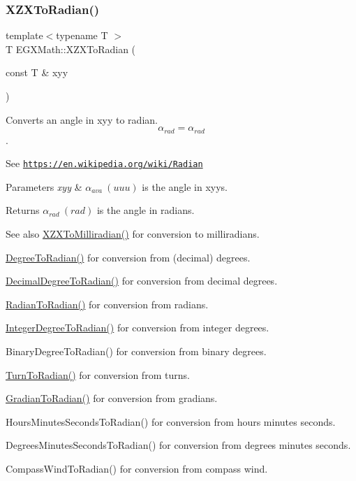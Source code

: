 \subsubsection{\texorpdfstring{X\+Z\+X\+To\+Radian()}{XZXToRadian()}}
{\footnotesize\ttfamily template$<$typename T $>$ \\
T E\+G\+X\+Math\+::\+X\+Z\+X\+To\+Radian (\begin{DoxyParamCaption}\item[{const T \&}]{xyy }\end{DoxyParamCaption})}



Converts an angle in xyy to radian. \[\alpha_{rad}=\alpha_{rad}\]. 

See \href{https://en.wikipedia.org/wiki/Radian}{\tt https\+://en.\+wikipedia.\+org/wiki/\+Radian} 
\begin{DoxyParams}{Parameters}
{\em xyy} & $\alpha_{ava}\ (uuu)$ is the angle in xyys. \\
\hline
\end{DoxyParams}
\begin{DoxyReturn}{Returns}
$\alpha_{rad}\ (rad)$ is the angle in radians. 
\end{DoxyReturn}
\begin{DoxySeeAlso}{See also}
\mbox{\hyperlink{group___e_g_x_math-_angle_conversions-_x_z_x_gadbd00eddee5bd9ee313fabb1a9d3ff3c}{X\+Z\+X\+To\+Milliradian()}} for conversion to milliradians. 

\mbox{\hyperlink{group___e_g_x_math-_angle_conversions-_degree_ga48585541b228c852c9d08a9eac3682f0}{Degree\+To\+Radian()}} for conversion from (decimal) degrees. 

\mbox{\hyperlink{group___e_g_x_math-_angle_conversions-_decimal_degree_ga906ee2c83cdf4caa59eb613dc2d5d52a}{Decimal\+Degree\+To\+Radian()}} for conversion from decimal degrees. 

\mbox{\hyperlink{group___e_g_x_math-_angle_conversions-_radian_gae08681bd86b8e7e4325f6c8cb3a0dc37}{Radian\+To\+Radian()}} for conversion from radians. 

\mbox{\hyperlink{group___e_g_x_math-_angle_conversions-_integer_degree_ga05d3368b00ea27b9895de2ffe5c8df38}{Integer\+Degree\+To\+Radian()}} for conversion from integer degrees. 

Binary\+Degree\+To\+Radian() for conversion from binary degrees. 

\mbox{\hyperlink{group___e_g_x_math-_angle_conversions-_turn_ga72e6d3c46ebfc25f7be5050136d8df16}{Turn\+To\+Radian()}} for conversion from turns. 

\mbox{\hyperlink{group___e_g_x_math-_angle_conversions-_gradian_ga7ea0a6f47a672715b960181606c8fd7b}{Gradian\+To\+Radian()}} for conversion from gradians. 

Hours\+Minutes\+Seconds\+To\+Radian() for conversion from hours minutes seconds. 

Degrees\+Minutes\+Seconds\+To\+Radian() for conversion from degrees minutes seconds. 

Compass\+Wind\+To\+Radian() for conversion from compass wind. 
\end{DoxySeeAlso}
